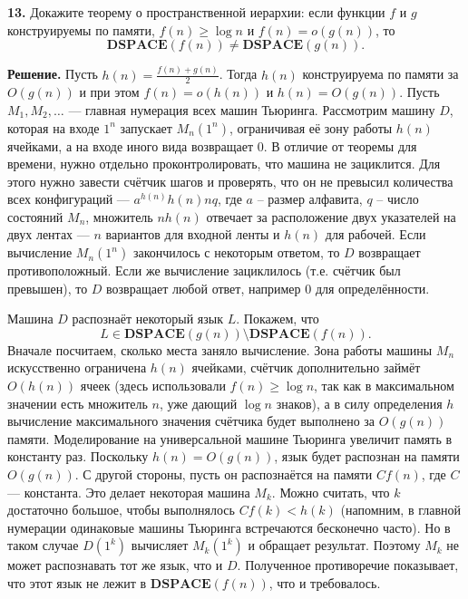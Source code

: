 \textbf{13.} Докажите теорему о пространственной иерархии: если функции $f$ и $g$ конструируемы по памяти, $f(n) \ge \log{n}$ и $f(n) = o(g(n))$, то
\[
\mathbf{DSPACE}(f(n)) \ne \mathbf{DSPACE}(g(n)).
\]

\textbf{Решение.} Пусть $h(n) = \frac{f(n) + g(n)}{2}$. Тогда $h(n)$ конструируема по памяти за $O(g(n))$ и при этом $f(n) = o(h(n))$ и $h(n) = O(g(n))$. Пусть $M_1, M_2, \ldots$ --- главная нумерация всех машин Тьюринга. Рассмотрим машину $D$, которая на входе $1^n$ запускает $M_n(1^n)$, ограничивая её зону работы $h(n)$ ячейками, а на входе иного вида возвращает 0. В отличие от теоремы для времени, нужно отдельно проконтролировать, что машина не зациклится. Для этого нужно завести счётчик шагов и проверять, что он не превысил количества всех конфигураций --- $a^{h(n)} h(n) n q$, где $a$ -- размер алфавита, $q$ -- число состояний $M_n$, множитель $nh(n)$ отвечает за расположение двух указателей на двух лентах --- $n$ вариантов для входной ленты и $h(n)$ для рабочей. Если вычисление $M_n(1^n)$ закончилось с некоторым ответом, то $D$ возвращает противоположный. Если же вычисление зациклилось (т.е. счётчик был превышен), то $D$ возвращает любой ответ, например 0 для определённости.

Машина $D$ распознаёт некоторый язык $L$. Покажем, что
\[
L \in \mathbf{DSPACE}(g(n)) \setminus \mathbf{DSPACE}(f(n)).
\]
Вначале посчитаем, сколько места заняло вычисление. Зона работы машины $M_n$ искусственно ограничена $h(n)$ ячейками, счётчик дополнительно займёт $O(h(n))$ ячеек (здесь использовали $f(n) \ge \log{n}$, так как в максимальном значении есть множитель $n$, уже дающий $\log{n}$ знаков), а в силу определения $h$ вычисление максимального значения счётчика будет выполнено за $O(g(n))$ памяти. Моделирование на универсальной машине Тьюринга увеличит память в константу раз. Поскольку $h(n) = O(g(n))$, язык будет распознан на памяти $O(g(n))$. С другой стороны, пусть он распознаётся на памяти $Cf(n)$, где $C$ --- константа. Это делает некоторая машина $M_k$. Можно считать, что $k$ достаточно большое, чтобы выполнялось $Cf(k) < h(k)$ (напомним, в главной нумерации одинаковые машины Тьюринга встречаются бесконечно часто). Но в таком случае $D(1^k)$ вычисляет $M_k(1^k)$ и обращает результат. Поэтому $M_k$ не может распознавать тот же язык, что и $D$. Полученное противоречие показывает, что этот язык не лежит в $\mathbf{DSPACE}(f(n))$, что и требовалось.